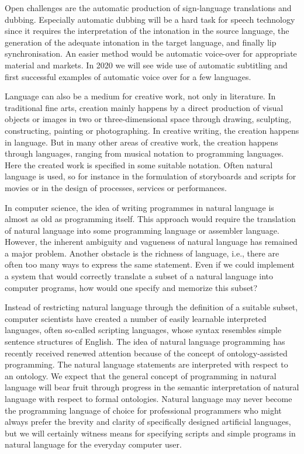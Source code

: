 \begin{multicols}{2}
Open challenges are the automatic production of sign-language translations and dubbing. Especially automatic dubbing will be a hard task for speech technology since it requires the interpretation of the intonation in the source language, the generation of the adequate intonation in the target language, and finally lip synchronisation. An easier method would be automatic voice-over for appropriate material and markets.  In 2020 we will see wide use of automatic subtitling and first successful examples of automatic voice over for a few languages.
 
Language can also be a medium for creative work, not only in literature. In traditional fine arts, creation mainly happens by a direct production of visual objects or images in two or three-dimensional space through drawing, sculpting, constructing, painting or photographing. In creative writing, the creation happens in language. But in many other areas of creative work, the creation happens through languages, ranging from musical notation to programming languages. Here the created work is specified in some suitable notation. Often natural language is used, so for instance in the formulation of storyboards and scripts for movies or in the design of processes, services or performances.
 
In computer science, the idea of writing programmes in natural language is almost as old as programming itself. This approach would require the translation of natural language into some programming language or assembler language. However, the inherent ambiguity and vagueness of natural language has remained a major problem. Another obstacle is the richness of language, i.e., there are often too many ways to express the same statement. Even if we could implement a system that would correctly translate a subset of a natural language into computer programs, how would one specify and memorize this subset?
 
Instead of restricting natural language through the definition of a suitable subset, computer scientists have created a number of easily learnable interpreted languages, often so-called scripting languages, whose syntax resembles simple sentence structures of English. The idea of natural language programming has recently received renewed attention because of the concept of ontology-assisted programming. The natural language statements are interpreted with respect to an ontology. We expect that the general concept of programming in natural language will bear fruit through progress in the semantic interpretation of natural language with respect to formal ontologies. Natural language may never become the programming language of choice for professional programmers who might always prefer the brevity and clarity of specifically designed artificial languages, but we will certainly witness means for specifying scripts and simple programs in natural language for the everyday computer user.
 

\end{multicols}
